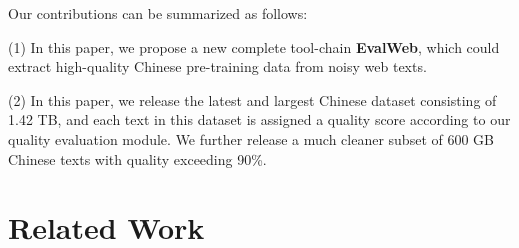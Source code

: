 \documentclass{article}
\begin{document}
  
Our contributions can be summarized as follows:

(1) In this paper, we propose a new complete tool-chain \textbf{EvalWeb}, which could extract high-quality Chinese pre-training data from noisy web texts.

(2) In this paper, we release the latest and largest Chinese dataset consisting of 1.42 TB, and each text in this dataset is assigned a quality score according to our quality evaluation module. We further release a much cleaner subset of 600 GB Chinese texts with quality exceeding 90\%.



\section{Related Work}
\end{document}
